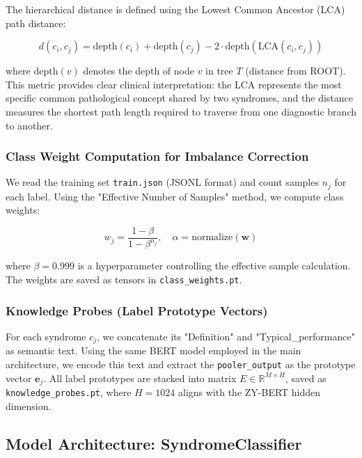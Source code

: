 \documentclass{article}
\begin{document}
The hierarchical distance is defined using the Lowest Common Ancestor (LCA) path distance:

\begin{equation}
d(c_i, c_j) = \text{depth}(c_i) + \text{depth}(c_j) - 2 \cdot \text{depth}(\text{LCA}(c_i, c_j))
\end{equation}

where $\text{depth}(v)$ denotes the depth of node $v$ in tree $T$ (distance from ROOT). This metric provides clear clinical interpretation: the LCA represents the most specific common pathological concept shared by two syndromes, and the distance measures the shortest path length required to traverse from one diagnostic branch to another.

\subsubsection{Class Weight Computation for Imbalance Correction}

We read the training set \texttt{train.json} (JSONL format) and count samples $n_j$ for each label. Using the "Effective Number of Samples" method, we compute class weights:

\begin{equation}
w_j = \frac{1-\beta}{1-\beta^{n_j}}, \quad \alpha = \text{normalize}(\mathbf{w})
\end{equation}

where $\beta = 0.999$ is a hyperparameter controlling the effective sample calculation. The weights are saved as tensors in \texttt{class\_weights.pt}.

\subsubsection{Knowledge Probes (Label Prototype Vectors)}

For each syndrome $c_j$, we concatenate its "Definition" and "Typical\_performance" as semantic text. Using the same BERT model employed in the main architecture, we encode this text and extract the \texttt{pooler\_output} as the prototype vector $\mathbf{e}_j$. All label prototypes are stacked into matrix $E \in \mathbb{R}^{M \times H}$, saved as \texttt{knowledge\_probes.pt}, where $H = 1024$ aligns with the ZY-BERT hidden dimension.

\subsection{Model Architecture: SyndromeClassifier}
\end{document}
